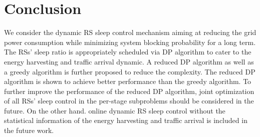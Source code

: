 \documentclass[conference]{IEEEtran}
\begin{document}
\section{Conclusion}\label{sec:conclusion}
 We consider the dynamic RS sleep control mechanism aiming at reducing the grid power consumption while minimizing system blocking probability for a long term. The RSs' sleep ratio is appropriately scheduled via DP algorithm to cater to the energy harvesting and traffic arrival dynamic. A reduced DP algorithm as well as a greedy algorithm is further proposed to reduce the complexity. The reduced DP algorithm is shown to achieve better performance than the greedy algorithm. To further improve the performance of the reduced DP algorithm, joint optimization of all RSs' sleep control in the per-stage subproblems should be considered in the future. On the other hand.
 online dynamic RS sleep control without the statistical information of the energy harvesting and traffic arrival is included in the future work.
\end{document}
